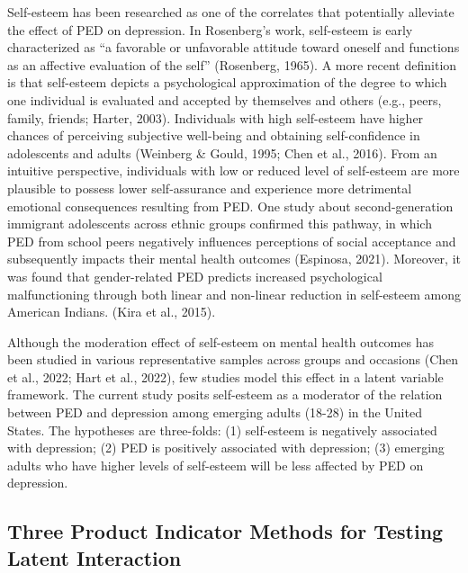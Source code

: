 \documentclass[
  man]{apa7}
\begin{document}
Self-esteem has been researched as one of the correlates that potentially alleviate the effect of PED on depression. In Rosenberg's work, self-esteem is early characterized as ``a favorable or unfavorable attitude toward oneself and functions as an affective evaluation of the self'' (Rosenberg, 1965). A more recent definition is that self-esteem depicts a psychological approximation of the degree to which one individual is evaluated and accepted by themselves and others (e.g., peers, family, friends; Harter, 2003). Individuals with high self-esteem have higher chances of perceiving subjective well-being and obtaining self-confidence in adolescents and adults (Weinberg \& Gould, 1995; Chen et al., 2016). From an intuitive perspective, individuals with low or reduced level of self-esteem are more plausible to possess lower self-assurance and experience more detrimental emotional consequences resulting from PED. One study about second-generation immigrant adolescents across ethnic groups confirmed this pathway, in which PED from school peers negatively influences perceptions of social acceptance and subsequently impacts their mental health outcomes (Espinosa, 2021). Moreover, it was found that gender-related PED predicts increased psychological malfunctioning through both linear and non-linear reduction in self-esteem among American Indians. (Kira et al., 2015).

Although the moderation effect of self-esteem on mental health outcomes has been studied in various representative samples across groups and occasions (Chen et al., 2022; Hart et al., 2022), few studies model this effect in a latent variable framework. The current study posits self-esteem as a moderator of the relation between PED and depression among emerging adults (18-28) in the United States. The hypotheses are three-folds: (1) self-esteem is negatively associated with depression; (2) PED is positively associated with depression; (3) emerging adults who have higher levels of self-esteem will be less affected by PED on depression.

\hypertarget{three-product-indicator-methods-for-testing-latent-interaction}{%
\subsection{Three Product Indicator Methods for Testing Latent Interaction}\label{three-product-indicator-methods-for-testing-latent-interaction}}
\end{document}

